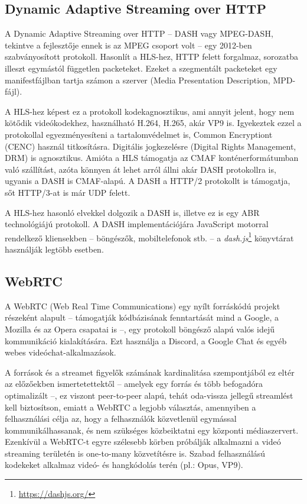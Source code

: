\subsection{Dynamic Adaptive Streaming over HTTP}

A Dynamic Adaptive Streaming over HTTP -- DASH vagy MPEG-DASH, tekintve a fejlesztője ennek is az MPEG csoport volt -- egy 2012-ben szabványosított protokoll. Hasonlít a HLS-hez, HTTP felett forgalmaz, sorozatba illeszt egymástól független packeteket. Ezeket a szegmentált packeteket egy manifestfájlban tartja számon a szerver (Media Presentation Description, MPD-fájl). \cite{Dash}

A HLS-hez képest ez a protokoll kodekagnosztikus, ami annyit jelent, hogy nem kötődik videókodekhez, használható H.264, H.265, akár VP9 is. \cite{DashIso} Igyekeztek ezzel a protokollal egyezményesíteni a tartalomvédelmet is, Common Encryptiont (CENC) használ titkosításra. Digitális jogkezelésre (Digital Rights Management, DRM) is agnosztikus. Amióta a HLS támogatja az CMAF konténerformátumban való szállítást, azóta könnyen át lehet arról állni akár DASH protokollra is, ugyanis a DASH is CMAF-alapú. A DASH a HTTP/2 protokollt is támogatja, sőt HTTP/3-at is már UDP felett.

A HLS-hez hasonló elvekkel dolgozik a DASH is, illetve ez is egy ABR technológiájú protokoll. A DASH implementációjára JavaScript motorral rendelkező kliensekben -- böngészők, mobiltelefonok stb. -- a \emph{dash.js}\footnote{\url{https://dashjs.org/}} könyvtárat használják legtöbb esetben.

\subsection{WebRTC}

A WebRTC (Web Real Time Communications) egy nyílt forráskódú projekt részeként alapult -- támogatják kódbázisának fenntartását mind a Google, a Mozilla és az Opera csapatai is --, egy protokoll böngésző alapú valós idejű kommunikáció kialakítására. Ezt használja a Discord, a Google Chat és egyéb webes videóchat-alkalmazások. \cite{StreamingHistory}

A források és a streamet figyelők számának kardinalitása szempontjából ez eltér az előzőekben ismertetettektől -- amelyek egy forrás és több befogadóra optimalizált --, ez viszont peer-to-peer alapú, tehát oda-vissza jellegű streamlést kell biztosítson, emiatt a WebRTC a legjobb választás, amennyiben a felhasználási célja az, hogy a felhasználók közvetlenül egymással kommunikálhassanak, és nem szükséges közbeiktatni egy központi médiaszervert. Ezenkívül a WebRTC-t egyre szélesebb körben próbálják alkalmazni a videó streaming területén is one-to-many közvetítésre is. Szabad felhasználású kodekeket alkalmaz videó- és hangkódolás terén (pl.: Opus, VP9). \cite{WebRTC}
